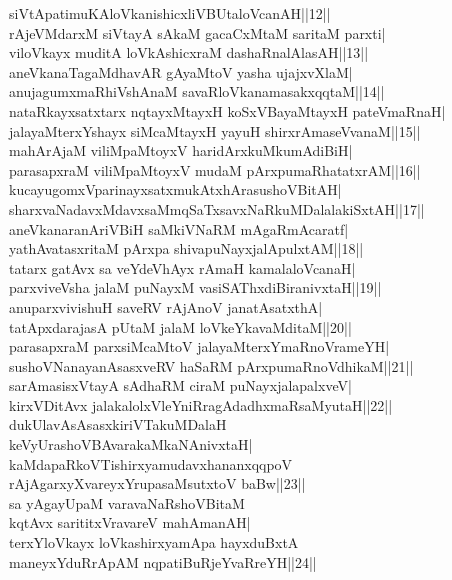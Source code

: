 \documentclass{article}
\begin{document}
siVtApatimuKAloVkanishicxliVBUtaloVcanAH||12||\\
rAjeVMdarxM siVtayA sAkaM gacaCxMtaM saritaM parxti|\\
viloVkayx muditA loVkAshicxraM dashaRnalAlasAH||13||\\
aneVkanaTagaMdhavAR gAyaMtoV yasha ujajxvXlaM|\\
anujagumxmaRhiVshAnaM savaRloVkanamasakxqqtaM||14||\\
nataRkayxsatxtarx nqtayxMtayxH koSxVBayaMtayxH pateVmaRnaH|\\
jalayaMterxYshayx siMcaMtayxH yayuH shirxrAmaseVvanaM||15||\\
mahArAjaM viliMpaMtoyxV haridArxkuMkumAdiBiH|\\
parasapxraM viliMpaMtoyxV mudaM pArxpumaRhatatxrAM||16||\\
kucayugomxVparinayxsatxmukAtxhArasushoVBitAH|\\
sharxvaNadavxMdavxsaMmqSaTxsavxNaRkuMDalalakiSxtAH||17||\\
aneVkanaranAriVBiH saMkiVNaRM mAgaRmAcaratf|\\
yathAvatasxritaM pArxpa shivapuNayxjalApulxtAM||18||\\
tatarx gatAvx sa veYdeVhAyx rAmaH kamalaloVcanaH|\\
parxviveVsha jalaM puNayxM vasiSAThxdiBiranivxtaH||19||\\
anuparxvivishuH saveRV rAjAnoV janatAsatxthA|\\
tatApxdarajasA pUtaM jalaM loVkeYkavaMditaM||20||\\
parasapxraM parxsiMcaMtoV jalayaMterxYmaRnoVrameYH|\\
sushoVNanayanAsasxveRV haSaRM pArxpumaRnoVdhikaM||21||\\
sarAmasisxVtayA sAdhaRM ciraM puNayxjalapalxveV|\\
kirxVDitAvx jalakalolxVleYniRragAdadhxmaRsaMyutaH||22||\\
dukUlavAsAsasxkiriVTakuMDalaH\\
keVyUrashoVBAvarakaMkaNAnivxtaH|\\
kaMdapaRkoVTishirxyamudavxhananxqqpoV\\
rAjAgarxyXvareyxYrupasaMsutxtoV baBw||23||\\
sa yAgayUpaM varavaNaRshoVBitaM\\
kqtAvx sarititxVravareV mahAmanAH|\\
terxYloVkayx loVkashirxyamApa hayxduBxtA\\
maneyxYduRrApAM nqpatiBuRjeYvaRreYH||24||\\
\end{document}
